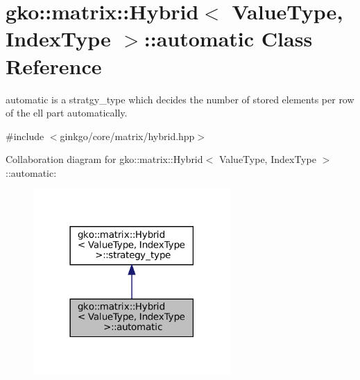 \hypertarget{classgko_1_1matrix_1_1Hybrid_1_1automatic}{}\section{gko\+:\+:matrix\+:\+:Hybrid$<$ Value\+Type, Index\+Type $>$\+:\+:automatic Class Reference}
\label{classgko_1_1matrix_1_1Hybrid_1_1automatic}


automatic is a stratgy\+\_\+type which decides the number of stored elements per row of the ell part automatically.  




{\ttfamily \#include $<$ginkgo/core/matrix/hybrid.\+hpp$>$}



Collaboration diagram for gko\+:\+:matrix\+:\+:Hybrid$<$ Value\+Type, Index\+Type $>$\+:\+:automatic\+:
\nopagebreak
\begin{figure}[H]
\begin{center}
\leavevmode
\includegraphics[width=213pt]{classgko_1_1matrix_1_1Hybrid_1_1automatic__coll__graph}
\end{center}
\end{figure}
